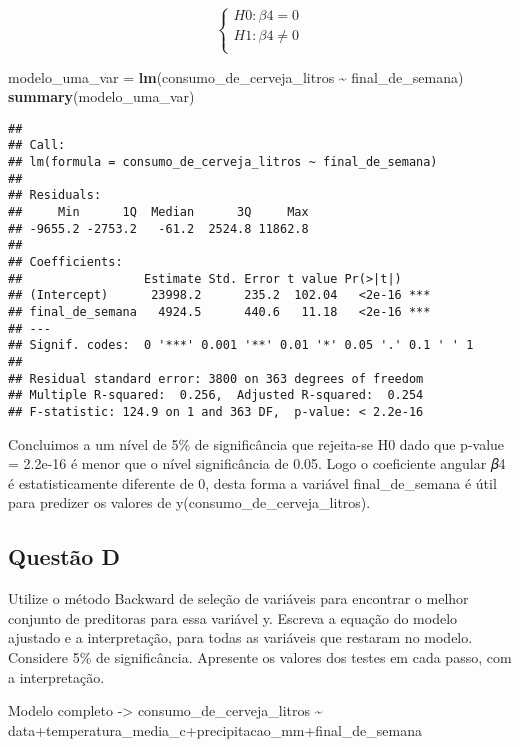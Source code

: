\documentclass[
]{article}
\newenvironment{Shaded}{\begin{snugshade}}{\end{snugshade}}
\newcommand{\FunctionTok}[1]{\textcolor[rgb]{0.13,0.29,0.53}{\textbf{#1}}}
\newcommand{\NormalTok}[1]{#1}
\newcommand{\OtherTok}[1]{\textcolor[rgb]{0.56,0.35,0.01}{#1}}
\newcommand{\SpecialCharTok}[1]{\textcolor[rgb]{0.81,0.36,0.00}{\textbf{#1}}}
\begin{document}
\[
\left\{ \begin{array}{rc} 
H0: \beta4 = 0 \\ 
H1: \beta4 \neq 0 \\ 
\end{array}\right.
\]

\begin{Shaded}
\begin{Highlighting}[]
\NormalTok{modelo\_uma\_var }\OtherTok{=} \FunctionTok{lm}\NormalTok{(consumo\_de\_cerveja\_litros }\SpecialCharTok{\textasciitilde{}}\NormalTok{ final\_de\_semana)}
\FunctionTok{summary}\NormalTok{(modelo\_uma\_var)}
\end{Highlighting}
\end{Shaded}

\begin{verbatim}
## 
## Call:
## lm(formula = consumo_de_cerveja_litros ~ final_de_semana)
## 
## Residuals:
##     Min      1Q  Median      3Q     Max 
## -9655.2 -2753.2   -61.2  2524.8 11862.8 
## 
## Coefficients:
##                 Estimate Std. Error t value Pr(>|t|)    
## (Intercept)      23998.2      235.2  102.04   <2e-16 ***
## final_de_semana   4924.5      440.6   11.18   <2e-16 ***
## ---
## Signif. codes:  0 '***' 0.001 '**' 0.01 '*' 0.05 '.' 0.1 ' ' 1
## 
## Residual standard error: 3800 on 363 degrees of freedom
## Multiple R-squared:  0.256,  Adjusted R-squared:  0.254 
## F-statistic: 124.9 on 1 and 363 DF,  p-value: < 2.2e-16
\end{verbatim}

Concluimos a um nível de 5\% de significância que rejeita-se H0 dado que
p-value = 2.2e-16 é menor que o nível significância de 0.05. Logo o
coeficiente angular 𝛽4 é estatisticamente diferente de 0, desta forma a
variável final\_de\_semana é útil para predizer os valores de
y(consumo\_de\_cerveja\_litros).

\hypertarget{questuxe3o-d}{%
\subsection{Questão D}\label{questuxe3o-d}}

Utilize o método Backward de seleção de variáveis para encontrar o
melhor conjunto de preditoras para essa variável y. Escreva a equação do
modelo ajustado e a interpretação, para todas as variáveis que restaram
no modelo. Considere 5\% de significância. Apresente os valores dos
testes em cada passo, com a interpretação.

Modelo completo -\textgreater{} consumo\_de\_cerveja\_litros
\textasciitilde{}
data+temperatura\_media\_c+precipitacao\_mm+final\_de\_semana
\end{document}
